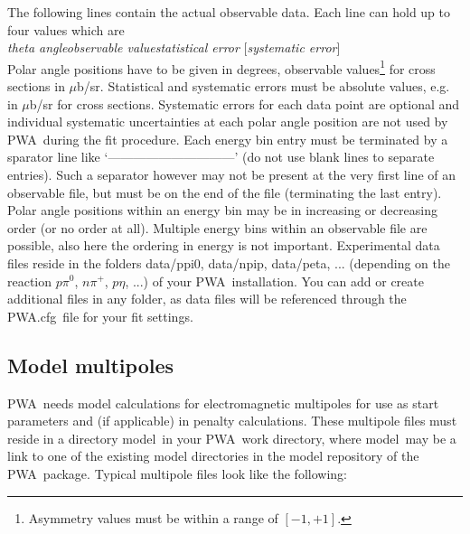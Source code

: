 \documentclass[a4paper,10pt]{article}
\def\PWA{\ttfamily PWA\rmfamily\ }
\def\bl{\phantom{0}}
\def\tt{\ttfamily}
\def\rm{\rmfamily}
\begin{document}
The following lines contain the actual observable data. Each line can hold up to four values which are\\
\tt\textit{theta angle\bl\bl\bl\bl observable value\bl\bl\bl\bl  statistical error\bl\bl\bl\bl}
[\textit{systematic error}]\rm\\
Polar angle positions have to be given in degrees, observable values\footnote{Asymmetry values must be within a range
of $[-1,+1]$.} for cross sections in $\mu$b/sr. Statistical and systematic
errors must be absolute values, e.g. in $\mu$b/sr for cross sections.
Systematic errors for each data point are optional and individual systematic uncertainties at each polar angle position
are not used by \PWA during the fit procedure.
Each energy bin entry must be terminated by a sparator line like
`\tt------------------------------\rm' (do not use blank lines to separate entries).
Such a separator however may not be present at the very first line of an observable file, but must be on the end of the file
(terminating the last entry).
Polar angle positions within an energy bin may be in increasing or decreasing order (or no order at all).
Multiple energy bins within an observable file are possible, also here the ordering in energy is not important.
Experimental data files reside in the folders \tt data/ppi0\rm, \tt data/npip\rm, 
\tt data/peta\rm, ... (depending on the reaction $p \pi^0$, $n\pi^+$, $p\eta$, ...) of your \PWA installation.
You can add or create additional files in any folder, as data files will be referenced through the 
\tt PWA.cfg\rm\ file for your fit settings.

\subsection{Model multipoles}

\PWA needs model calculations for electromagnetic multipoles for use as start parameters and (if applicable) in penalty calculations.
These multipole files must reside in a directory \tt model\rm\ in your \PWA work directory, where
\tt model\rm\ may be a link to one of the existing model directories in the model repository of the \PWA package.
Typical multipole files look like the following:\\
\end{document}
